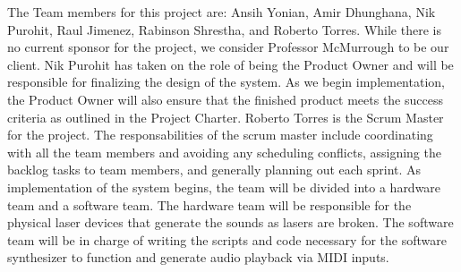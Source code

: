 The Team members for this project are: Ansih Yonian, Amir Dhunghana, Nik Purohit, Raul Jimenez, Rabinson Shrestha, and Roberto Torres. While there is no current sponsor for the project, we consider Professor McMurrough to be our client. Nik Purohit has taken on the role of being the Product Owner and will be responsible for finalizing the design of the system. As we begin implementation, the Product Owner will also ensure that the finished product meets the success criteria as outlined in the Project Charter. Roberto Torres is the Scrum Master for the project. The responsabilities of the scrum master include coordinating with all the team members and avoiding any scheduling conflicts, assigning the backlog tasks to team members, and generally planning out each sprint. As implementation of the system begins, the team will be divided into a hardware team and a software team. The hardware team will be responsible for the physical laser devices that generate the sounds as lasers are broken. The software team will be in charge of writing the scripts and code necessary for the software synthesizer to function and generate audio playback via MIDI inputs.
